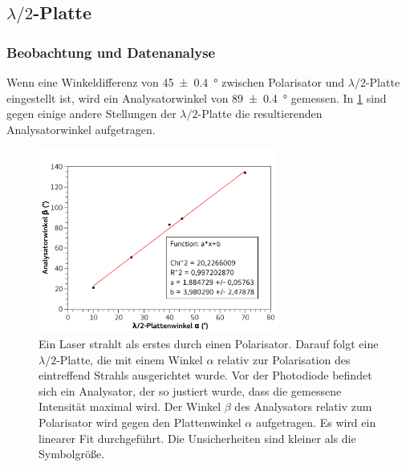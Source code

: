 \documentclass[
	a4paper,
	12pt,
	pagesize,
	ngerman
]{scrartcl}
\begin{document}
	\subsection{$\lambda/2$-Platte}
	\subsubsection{Beobachtung und Datenanalyse}
	Wenn eine Winkeldifferenz von \SI{45+-0,4}{\degree} zwischen Polarisator und $\lambda/2$-Platte eingestellt ist, wird ein Analysatorwinkel von \SI{89+-0,4}{\degree} gemessen.
	In \cref{fig_lambda} sind gegen einige andere Stellungen der $\lambda/2$-Platte die resultierenden Analysatorwinkel aufgetragen.

	\begin{figure}[H]
		\includegraphics[width=0.7\textwidth]{fig_lambda}
		\centering
		\caption{Ein Laser strahlt als erstes durch einen Polarisator. 
		Darauf folgt eine $\lambda/2$-Platte, die mit einem Winkel $\alpha$ relativ zur Polarisation des eintreffend Strahls ausgerichtet wurde. 
		Vor der Photodiode befindet sich ein Analysator, der so justiert wurde, dass die gemessene Intensität maximal wird.
		Der Winkel $\beta$ des Analysators relativ zum Polarisator wird gegen den Plattenwinkel $\alpha$ aufgetragen.
		Es wird ein linearer Fit durchgeführt.
		Die Unsicherheiten sind kleiner als die Symbolgröße.}
		\label{fig_lambda}
		\centering
	\end{figure}
\end{document}
